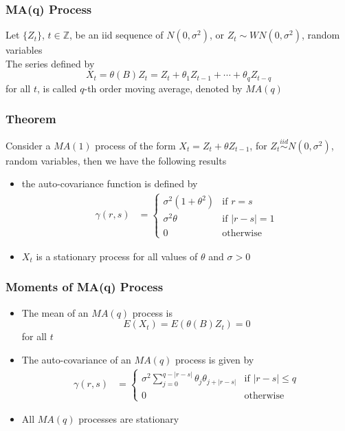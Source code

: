 \documentclass[11pt]{article}
\newcommand{\Z}{{\mathbb{Z}}}
\begin{document}
\subsubsection{MA(q) Process}
Let $\{Z_t\}$, $t\in\Z$, be an iid sequence of $N(0,\sigma^2)$, or $Z_t\sim WN(0,\sigma^2)$, random variables \\
The series defined by 
\[X_t=\theta(B)Z_t = Z_t+\theta_1Z_{t-1}+\cdots+\theta_qZ_{t-q}\]   
for all $t$, is called $q$-th order moving average, denoted by $MA(q)$
\subsubsection*{Theorem}
Consider a $MA(1)$ process of the form $X_t=Z_t+\theta Z_{t-1}$, for $Z_t\overset{iid}{\sim} N(0,\sigma^2)$, random variables, then we have the following results 
\begin{itemize}
    \item the auto-covariance function is defined by 
    \begin{align*}
        \gamma(r,s) &= 
        \begin{cases}
            \sigma^2(1+\theta^2) & \text{if } r=s \\
            \sigma^2\theta & \text{if } |r-s|=1 \\
            0 & \text{otherwise}
        \end{cases}
    \end{align*}
    \item $X_t$ is a stationary process for all values of $\theta$ and $\sigma>0$
\end{itemize}
\subsubsection{Moments of MA(q) Process}
\begin{itemize}
    \item The mean of an $MA(q)$ process is \[E(X_t) = E(\theta(B)Z_t) = 0\] for all $t$
    \item The auto-covariance of an $MA(q)$ process is given by 
    \begin{align*}
        \gamma(r,s) &=
        \begin{cases}
            \sigma^2\sum_{j=0}^{q-|r-s|}\theta_j\theta_{j+|r-s|} &\text{if } |r-s|\leq q \\
            0 &\text{otherwise}
        \end{cases}
    \end{align*}
    \item All $MA(q)$ processes are stationary 
\end{itemize}
\end{document}

